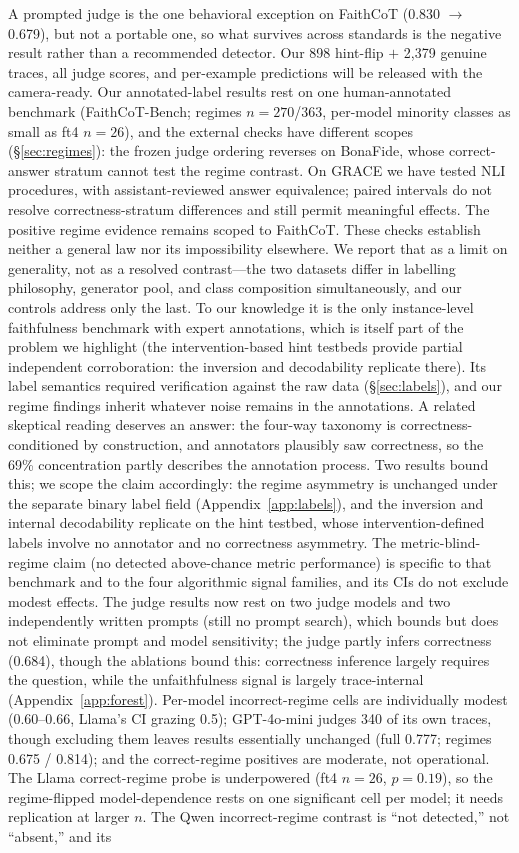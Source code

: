 \documentclass[11pt]{article}
\begin{document}
A prompted judge is the one behavioral exception on FaithCoT (0.830 $\to$ 0.679), but not a portable one, so what survives across standards is the negative result rather than a recommended detector. Our 898 hint-flip $+$ 2{,}379 genuine traces, all judge scores, and per-example predictions will be released with the camera-ready. Our annotated-label results rest on one human-annotated benchmark (FaithCoT-Bench; regimes $n{=}270$/$363$, per-model minority classes as small as ft4 $n{=}26$), and the external checks have different scopes (\S\ref{sec:regimes}): the frozen judge ordering reverses on BonaFide, whose correct-answer stratum cannot test the regime contrast. On GRACE we have tested NLI procedures, with assistant-reviewed answer equivalence; paired intervals do not resolve correctness-stratum differences and still permit meaningful effects. The positive regime evidence remains scoped to FaithCoT. These checks establish neither a general law nor its impossibility elsewhere. We report that as a limit on generality, not as a resolved contrast---the two datasets differ in labelling philosophy, generator pool, and class composition simultaneously, and our controls address only the last. To our knowledge it is the only instance-level faithfulness benchmark with expert annotations, which is itself part of the problem we highlight (the intervention-based hint testbeds provide partial independent corroboration: the inversion and decodability replicate there). Its label semantics required verification against the raw data (\S\ref{sec:labels}), and our regime findings inherit whatever noise remains in the annotations. A related skeptical reading deserves an answer: the four-way taxonomy is correctness-conditioned by construction, and annotators plausibly saw correctness, so the 69\% concentration partly describes the annotation process. Two results bound this; we scope the claim accordingly: the regime asymmetry is unchanged under the separate binary label field (Appendix~\ref{app:labels}), and the inversion and internal decodability replicate on the hint testbed, whose intervention-defined labels involve no annotator and no correctness asymmetry. The metric-blind-regime claim (no detected above-chance metric performance) is specific to that benchmark and to the four algorithmic signal families, and its CIs do not exclude modest effects. The judge results now rest on two judge models and two independently written prompts (still no prompt search), which bounds but does not eliminate prompt and model sensitivity; the judge partly infers correctness (0.684), though the ablations bound this: correctness inference largely requires the question, while the unfaithfulness signal is largely trace-internal (Appendix~\ref{app:forest}). Per-model incorrect-regime cells are individually modest (0.60--0.66, Llama's CI grazing 0.5); GPT-4o-mini judges 340 of its own traces, though excluding them leaves results essentially unchanged (full 0.777; regimes 0.675 / 0.814); and the correct-regime positives are moderate, not operational. The Llama correct-regime probe is underpowered (ft4 $n{=}26$, $p{=}0.19$), so the regime-flipped model-dependence rests on one significant cell per model; it needs replication at larger $n$. The Qwen incorrect-regime contrast is ``not detected,'' not ``absent,'' and its 
\end{document}

